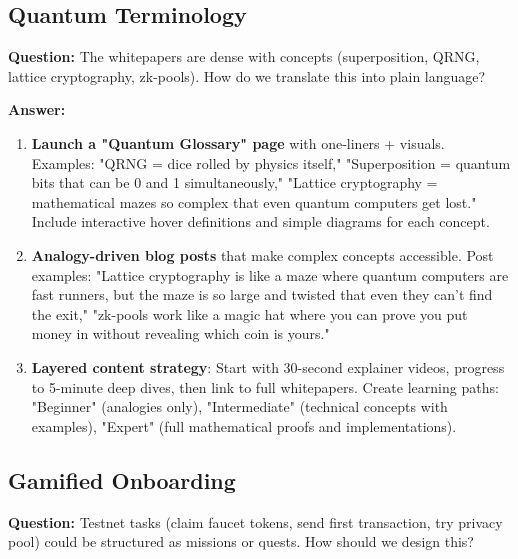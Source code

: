 \documentclass[11pt,a4paper]{article}
\begin{document}
\subsection{Quantum Terminology}
\textbf{Question:} The whitepapers are dense with concepts (superposition, QRNG, lattice cryptography, zk-pools). How do we translate this into plain language?

\textbf{Answer:}
\begin{enumerate}
\item \textbf{Launch a "Quantum Glossary" page} with one-liners + visuals. Examples: "QRNG = dice rolled by physics itself," "Superposition = quantum bits that can be 0 and 1 simultaneously," "Lattice cryptography = mathematical mazes so complex that even quantum computers get lost." Include interactive hover definitions and simple diagrams for each concept.

\item \textbf{Analogy-driven blog posts} that make complex concepts accessible. Post examples: "Lattice cryptography is like a maze where quantum computers are fast runners, but the maze is so large and twisted that even they can't find the exit," "zk-pools work like a magic hat where you can prove you put money in without revealing which coin is yours."

\item \textbf{Layered content strategy}: Start with 30-second explainer videos, progress to 5-minute deep dives, then link to full whitepapers. Create learning paths: "Beginner" (analogies only), "Intermediate" (technical concepts with examples), "Expert" (full mathematical proofs and implementations).
\end{enumerate}

\subsection{Gamified Onboarding}
\textbf{Question:} Testnet tasks (claim faucet tokens, send first transaction, try privacy pool) could be structured as missions or quests. How should we design this?
\end{document}

